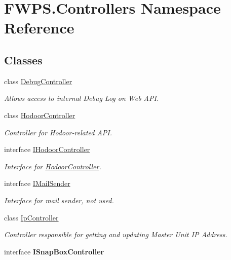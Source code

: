 \hypertarget{namespace_f_w_p_s_1_1_controllers}{}\section{F\+W\+P\+S.\+Controllers Namespace Reference}
\label{namespace_f_w_p_s_1_1_controllers}
\subsection*{Classes}
\begin{DoxyCompactItemize}
\item 
class \mbox{\hyperlink{class_f_w_p_s_1_1_controllers_1_1_debug_controller}{Debug\+Controller}}
\begin{DoxyCompactList}\small\item\em Allows access to internal Debug Log on Web A\+PI. \end{DoxyCompactList}\item 
class \mbox{\hyperlink{class_f_w_p_s_1_1_controllers_1_1_hodoor_controller}{Hodoor\+Controller}}
\begin{DoxyCompactList}\small\item\em Controller for Hodoor-\/related A\+PI. \end{DoxyCompactList}\item 
interface \mbox{\hyperlink{interface_f_w_p_s_1_1_controllers_1_1_i_hodoor_controller}{I\+Hodoor\+Controller}}
\begin{DoxyCompactList}\small\item\em Interface for \mbox{\hyperlink{class_f_w_p_s_1_1_controllers_1_1_hodoor_controller}{Hodoor\+Controller}}. \end{DoxyCompactList}\item 
interface \mbox{\hyperlink{interface_f_w_p_s_1_1_controllers_1_1_i_mail_sender}{I\+Mail\+Sender}}
\begin{DoxyCompactList}\small\item\em Interface for mail sender, not used. \end{DoxyCompactList}\item 
class \mbox{\hyperlink{class_f_w_p_s_1_1_controllers_1_1_ip_controller}{Ip\+Controller}}
\begin{DoxyCompactList}\small\item\em Controller responsible for getting and updating Master Unit IP Address. \end{DoxyCompactList}\item 
interface {\bfseries I\+Snap\+Box\+Controller}

\end{DoxyCompactItemize}
